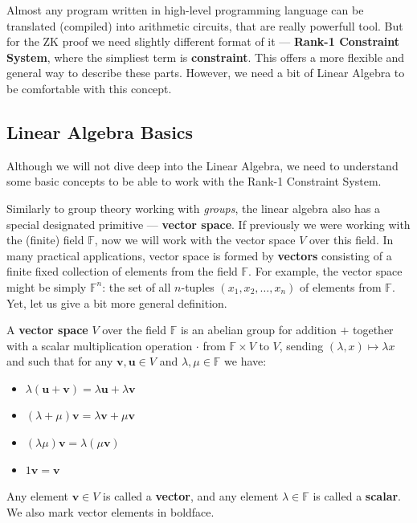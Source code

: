 \documentclass[../lecture-notes.tex]{subfiles}
\begin{document}
Almost any program written in high-level programming language can be translated (compiled) into
arithmetic circuits, that are really powerfull tool. But for the ZK proof we need slightly different
format of it --- \textbf{Rank-1 Constraint System}, where the simpliest term is \textbf{constraint}. 
This offers a more flexible and general way to describe these parts. However, we need a bit of 
Linear Algebra to be comfortable with this concept.

\subsection{Linear Algebra Basics}

Although we will not dive deep into the Linear Algebra, we need to understand some basic concepts to
be able to work with the Rank-1 Constraint System.

Similarly to group theory working with \textit{groups}, the linear algebra also has a special designated primitive --- \textbf{vector space}. If previously we were working
with the (finite) field $\mathbb{F}$, now we will work with the vector space $V$ over this field. In many practical applications,
vector space is formed by \textbf{vectors} consisting of a finite fixed collection of elements from the field $\mathbb{F}$. For example,
the vector space might be simply $\mathbb{F}^n$: the set of all $n$-tuples $(x_1,x_2,\dots,x_n)$ of elements from $\mathbb{F}$. Yet, let us give a bit more general definition.

\begin{definition}
    A \textbf{vector space} $V$ over the field $\mathbb{F}$ is an abelian group for addition $+$ together with a scalar multiplication operation $\cdot$ from $\mathbb{F} \times V$ to $V$, sending $(\lambda,x) \mapsto \lambda x$ and such that for any $\mathbf{v},\mathbf{u} \in V$ and $\lambda,\mu \in \mathbb{F}$ we have:
    \begin{itemize}
        \item $\lambda(\mathbf{u}+\mathbf{v}) = \lambda \mathbf{u} + \lambda \mathbf{v}$
        \item $(\lambda + \mu)\mathbf{v} = \lambda \mathbf{v} + \mu \mathbf{v}$
        \item $(\lambda \mu)\mathbf{v} = \lambda(\mu \mathbf{v})$
        \item $1\mathbf{v} = \mathbf{v}$
    \end{itemize}

    Any element $\mathbf{v} \in V$ is called a \textbf{vector}, and any element $\lambda \in \mathbb{F}$ is called a \textbf{scalar}. We also mark vector elements in boldface.
\end{definition}
\end{document}

